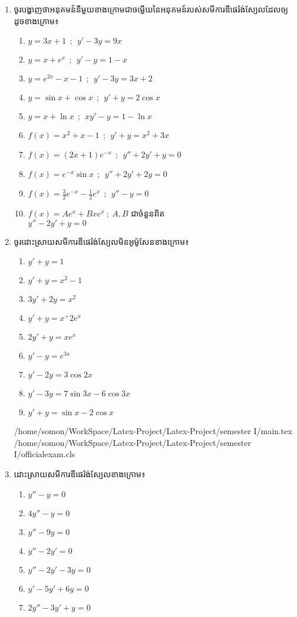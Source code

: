 \documentclass[12pt, a4paper]{article}
\begin{document}
\begin{enumerate}[m]
	\item ចូរបង្ហាញថាអនុគមន៍នីមួយខាងក្រោមជាចម្លើយនៃអនុគមន៍របស់សមីការឌីផេរ៉ង់ស្យែលដែលឲ្យដូចខាងក្រោម៖
	\begin{enumerate}[k,2]
		\item $y=3x+1~~;~~y'-3y=9x$
		\item $y=x+e^x~~;~~y'-y=1-x$
		\item $y=e^{2x}-x-1~~;~~y'-3y=3x+2$
		\item $y=\sin x+\cos x~~;~~y'+y=2\cos x$
		\item $y=x+\ln x~~;~~xy'-y=1-\ln x$
		\item $f(x)=x^2+x-1~~;~~y'+y=x^2+3x$
		\item $f(x)=\left(2x+1\right)e^{-x}~~;~~y''+2y'+y=0$
		\item $f(x)=e^{-x}\sin x~~;~~y''+2y'+2y=0$
		\item $f(x)=\frac{3}{2}e^{-x}-\frac{1}{2}e^x~~;~~y''-y=0$
		\item $f(x)=Ae^x+Bxe^x~;~A,B$ ជាចំនួនពិត\\ $y''-2y'+y=0$
	\end{enumerate}
	\item ចូរដោះស្រាយសមីការឌីផេរ៉ង់ស្យែលមិនអូម៉ូសែនខាងក្រោម៖
	\begin{enumerate}[k,3]
		\item $y'+y=1$
		\item $y'+y=x^2-1$
		\item $3y'+2y=x^2$
		\item $y'+y=x^+2e^x$
		\item $2y'+y=xe^x$
		\item $y'-y=e^{3x}$
		\item $y'-2y=3\cos2x$
		\item $y'-3y=7\sin3x-6\cos3x$
		\item $y'+y=\sin x-2\cos x$
	\end{enumerate}\newpage/home/somon/WorkSpace/Latex-Project/Latex-Project/semester I/main.tex
/home/somon/WorkSpace/Latex-Project/Latex-Project/semester I/officialexam.cls
	\item ដោះស្រាយសមីការឌីផេរ៉ង់ស្យែលខាងក្រោម៖
	\begin{enumerate}[k,2]
		\item $y''-y=0$
		\item $4y''-y=0$
		\item $y''-9y=0$
		\item $y''-2y'=0$
		\item $y''-2y'-3y=0$
		\item $y'-5y'+6y=0$
		\item $2y''-3y'+y=0$

\end{enumerate}
\end{enumerate}
\end{document}
